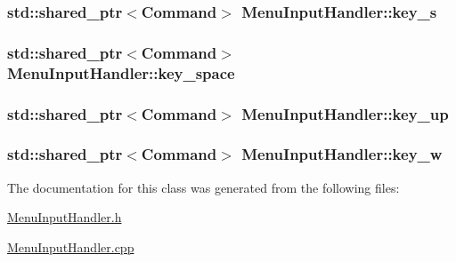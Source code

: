 \subsubsection[{key\+\_\+s}]{\setlength{\rightskip}{0pt plus 5cm}std\+::shared\+\_\+ptr$<${\bf Command}$>$ Menu\+Input\+Handler\+::key\+\_\+s\hspace{0.3cm}{\ttfamily [private]}}\label{class_menu_input_handler_aa16ab7856da1bc4c6dea371e244939fb}
\hypertarget{class_menu_input_handler_a8f596f6b958c7007a3ccc44ac3d8666e}{}
\subsubsection[{key\+\_\+space}]{\setlength{\rightskip}{0pt plus 5cm}std\+::shared\+\_\+ptr$<${\bf Command}$>$ Menu\+Input\+Handler\+::key\+\_\+space\hspace{0.3cm}{\ttfamily [private]}}\label{class_menu_input_handler_a8f596f6b958c7007a3ccc44ac3d8666e}
\hypertarget{class_menu_input_handler_ae1b3b9df835e3182dba3bbf1fd8b98aa}{}
\subsubsection[{key\+\_\+up}]{\setlength{\rightskip}{0pt plus 5cm}std\+::shared\+\_\+ptr$<${\bf Command}$>$ Menu\+Input\+Handler\+::key\+\_\+up\hspace{0.3cm}{\ttfamily [private]}}\label{class_menu_input_handler_ae1b3b9df835e3182dba3bbf1fd8b98aa}
\hypertarget{class_menu_input_handler_a052c981814cc918c88d17d7b4f0deb0e}{}
\subsubsection[{key\+\_\+w}]{\setlength{\rightskip}{0pt plus 5cm}std\+::shared\+\_\+ptr$<${\bf Command}$>$ Menu\+Input\+Handler\+::key\+\_\+w\hspace{0.3cm}{\ttfamily [private]}}\label{class_menu_input_handler_a052c981814cc918c88d17d7b4f0deb0e}


The documentation for this class was generated from the following files\+:\begin{DoxyCompactItemize}
\item 
\hyperlink{_menu_input_handler_8h}{Menu\+Input\+Handler.\+h}\item 
\hyperlink{_menu_input_handler_8cpp}{Menu\+Input\+Handler.\+cpp}\end{DoxyCompactItemize}
